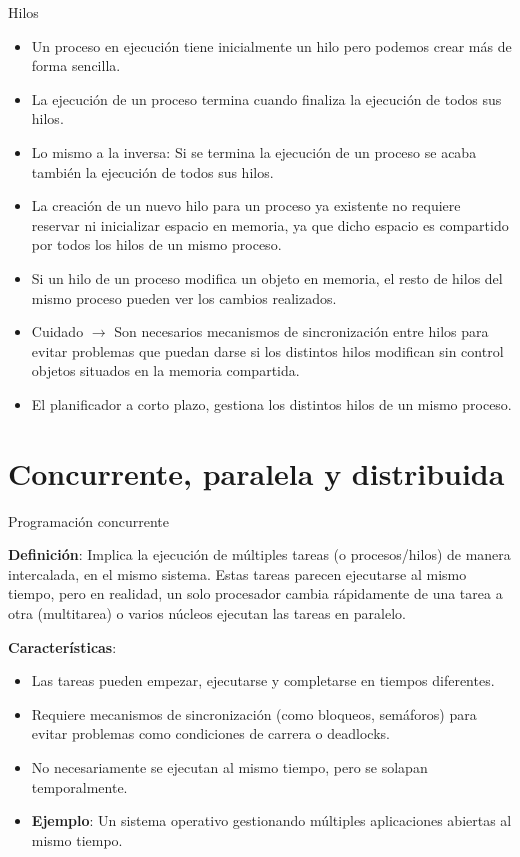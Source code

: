 \documentclass{beamer}
\begin{document}
\begin{frame}{Hilos}
    \begin{itemize}
        \item Un proceso en ejecución tiene inicialmente un hilo pero podemos crear más de
        forma sencilla.
        \item La ejecución de un proceso termina cuando finaliza la ejecución de todos sus hilos.
        \item Lo mismo a la inversa: Si se termina la ejecución de un proceso se acaba también la
        ejecución de todos sus hilos.
        \item La creación de un nuevo hilo para un proceso ya existente no requiere reservar ni
        inicializar espacio en memoria, ya que dicho espacio es compartido por todos los
        hilos de un mismo proceso.
        \item Si un hilo de un proceso modifica un objeto en memoria, el resto de hilos del mismo
        proceso pueden ver los cambios realizados.
    \end{itemize}
\end{frame}

\begin{frame}
    \begin{itemize}
    \item Cuidado $\to$ Son necesarios mecanismos de sincronización entre hilos para evitar
    problemas que puedan darse si los distintos hilos modifican sin control objetos
    situados en la memoria compartida.
    \item El planificador a corto plazo, gestiona los distintos hilos de un mismo proceso.
    \end{itemize}
\end{frame}

\section{Concurrente, paralela y distribuida}


\begin{frame}{Programación concurrente}

\textbf{Definición}: Implica la ejecución de múltiples tareas (o procesos/hilos) de manera intercalada, en el mismo sistema. Estas tareas parecen ejecutarse al mismo tiempo, pero en realidad, un solo procesador cambia rápidamente de una tarea a otra (multitarea) o varios núcleos ejecutan las tareas en paralelo.

\textbf{Características}:
    \begin{itemize}
        \item Las tareas pueden empezar, ejecutarse y completarse en tiempos diferentes.
        \item Requiere mecanismos de sincronización (como bloqueos, semáforos) para evitar problemas como condiciones de carrera o deadlocks.
        \item No necesariamente se ejecutan al mismo tiempo, pero se solapan temporalmente.
        \item \textbf{Ejemplo}: Un sistema operativo gestionando múltiples aplicaciones abiertas al mismo tiempo.
    \end{itemize}
\end{frame}
\end{document}
